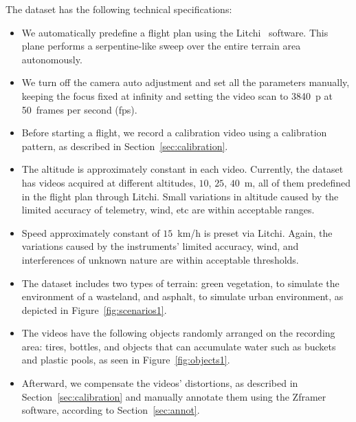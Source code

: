 The dataset has the following technical specifications:
%
\begin{itemize}
  \item We automatically predefine a flight plan using the Litchi~\cite{web:litchi} software.
  This plane performs a serpentine-like sweep over the entire terrain area autonomously.
%
  \item We turn off the camera auto adjustment and set all the parameters manually,
  keeping the focus fixed at infinity and
  setting the video scan to 3840~p at 50~frames per second (fps).
%
  \item Before starting a flight, we record a calibration video using a calibration pattern, as described in Section~\ref{sec:calibration}.
%
  \item The altitude is approximately constant in each video.
  Currently, the dataset has videos acquired at different altitudes, \eg $10$, $25$, $40$~m, all of them predefined in the flight plan through Litchi.
  Small variations in altitude caused by the limited accuracy of telemetry, wind, etc are within acceptable ranges.
%
  \item Speed approximately constant of $15$~km/h is preset via Litchi.
  Again, the variations caused by the instruments' limited accuracy, wind, and interferences of unknown nature are within acceptable thresholds.
%
  \item The dataset includes two types of terrain: green vegetation, to simulate the environment of a wasteland, and asphalt, to simulate urban environment, as depicted in Figure~\ref{fig:scenarios1}.
%
  \item The videos have the following objects randomly arranged on the recording area: tires, bottles, and objects that can accumulate water such as buckets and plastic pools, as seen in Figure~\ref{fig:objects1}.
%
  \item Afterward, we compensate the videos' distortions, as described in Section~\ref{sec:calibration} and manually annotate them using the Zframer software, according to Section~\ref{sec:annot}.
%
\end{itemize}

